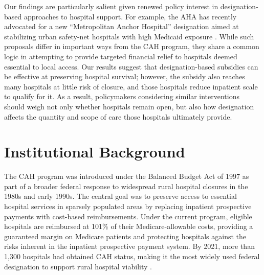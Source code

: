 \documentclass[a4paper, 12pt, twoside]{article}
\begin{document}
Our findings are particularly salient given renewed policy interest in designation-based approaches to hospital support. For example, the AHA has recently advocated for a new ``Metropolitan Anchor Hospital'' designation aimed at stabilizing urban safety-net hospitals with high Medicaid exposure \citep{hartzman2022}. While such proposals differ in important ways from the CAH program, they share a common logic in attempting to provide targeted financial relief to hospitals deemed essential to local access. Our results suggest that designation-based subsidies can be effective at preserving hospital survival; however, the subsidy also reaches many hospitals at little risk of closure, and those hospitals reduce inpatient scale to qualify for it. As a result, policymakers considering similar interventions should weigh not only whether hospitals remain open, but also how designation affects the quantity and scope of care those hospitals ultimately provide.

\section{Institutional Background}
\label{sec:background}

The CAH program was introduced under the Balanced Budget Act of 1997 as part of a broader federal response to widespread rural hospital closures in the 1980s and early 1990s. The central goal was to preserve access to essential hospital services in sparsely populated areas by replacing inpatient prospective payments with cost-based reimbursements. Under the current program, eligible hospitals are reimbursed at 101\% of their Medicare-allowable costs, providing a guaranteed margin on Medicare patients and protecting hospitals against the risks inherent in the inpatient prospective payment system. By 2021, more than 1,300 hospitals had obtained CAH status, making it the most widely used federal designation to support rural hospital viability \citep{crs2023}.
\end{document}
